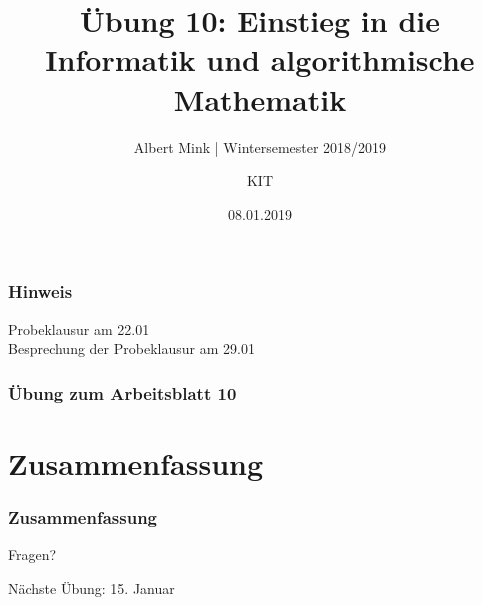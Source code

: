 \documentclass[c,18pt]{beamer}
\date{08.01.2019}
\title[Übung 10: Einstieg in die Informatik und algorithmische Mathematik]
  {Übung 10: Einstieg in die Informatik und algorithmische Mathematik}
\subtitle{Albert Mink | Wintersemester 2018/2019}
\author[Albert Mink, ]{KIT}
\institute[Institut für Angewandte und Numerische Mathematik (IANM)]{Institut für Angewandte und Numerische Mathematik}
\begin{document}
\begin{frame}
  \maketitle
\end{frame}

\begin{frame}
  \frametitle{Hinweis}%

Probeklausur am 22.01
\\
Besprechung der Probeklausur am 29.01
\end{frame}

\begin{frame}
  \frametitle{Übung zum Arbeitsblatt 10}%
\tableofcontents[hideallsubsections]
\end{frame}


\setcounter{exercise}{31}
\setcounter{exercise}{32}

\section{Zusammenfassung}
\begin{frame}
  \frametitle{Zusammenfassung}%
\tableofcontents[hideallsubsections]
\end{frame}

\begin{frame}
\centering
\Huge\textcolor{KITgreen}{Fragen?}
\vspace{2cm}

{\LARGE
Nächste Übung: 15. Januar\\
}
\end{frame}


\end{document}
